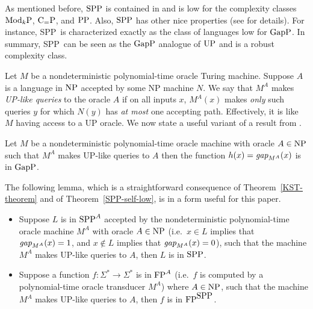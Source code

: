 \documentclass{elsart}
\newcommand{\UP}{\mbox{\rm UP}}
\newcommand{\PP}{\mbox{\rm PP}}
\newcommand{\GapP}{\mbox{\rm GapP}}
\newcommand{\NP}{\mbox{\rm NP}}
\newcommand{\FP}{\mbox{\rm FP}}
\newcommand{\ModkP}{\mbox{\rm Mod$_k$P}}
\newcommand{\SPP}{\mbox{\rm SPP}}
\newcommand{\CeqP}{\mbox{\rm C$_=$P}}
\newcommand{\gap}{\mbox{\it gap}}
\begin{document}
As mentioned before, $\SPP$ is contained in and is low for the
complexity classes $\ModkP$, $\CeqP$, and $\PP$.  Also, $\SPP$ has
other nice properties (see \cite{fenner91gapdefinable} for details).
For instance, \SPP\ is characterized exactly as the class of languages
low for $\GapP$. In summary, \SPP\ can be seen as the $\GapP$ analogue
of $\UP$ and is a robust complexity class. 

Let $M$ be a nondeterministic polynomial-time oracle Turing machine.
Suppose $A$ is a language in $\NP$ accepted by some NP machine $N$.
We say that $M^A$ makes {\em UP-like queries} to the oracle $A$ if on
all inputs $x$, $M^A(x)$ makes {\em only} such queries $y$ for which
$N(y)$ has {\em at most} one accepting path.  Effectively, it is like
$M$ having access to a UP oracle. We now state a useful variant of a
result from \cite{kobler92graph,gi-book}.

\begin{thm}\label{KST-theorem}
  Let $M$ be a nondeterministic polynomial-time oracle machine with
  oracle $A\in\NP$ such that $M^A$ makes UP-like queries to $A$ then
  the function $h(x)=\gap_{M^{A}}(x)$ is in $\GapP$.
\end{thm} 

%

The following lemma, which is a straightforward consequence of
Theorem~\ref{KST-theorem} and of Theorem~\ref{SPP-self-low}, is in a
form useful for this paper.

\begin{lem}\label{KST-cor}\mbox{}
\begin{itemize}
\item Suppose $L$ is in $\SPP^A$ accepted by the nondeterministic
  polynomial-time oracle machine $M^A$ with oracle $A\in\NP$ (i.e.\ 
  $x\in L$ implies that $\gap_{M^A}(x)=1$, and $x\not\in L$ implies
  that $\gap_{M^A}(x)=0$), such that the machine $M^A$ makes UP-like
  queries to $A$, then $L$ is in $\SPP$.
\item Suppose a function $f:\Sigma^*\rightarrow\Sigma^*$ is in $\FP^A$
  (i.e.\ $f$ is computed by a polynomial-time oracle transducer $M^A$)
  where $A\in\NP$, such that the machine $M^A$ makes UP-like queries
  to $A$, then $f$ is in $\FP^{\SPP}$.
\end{itemize}
\end{lem}
\end{document}
